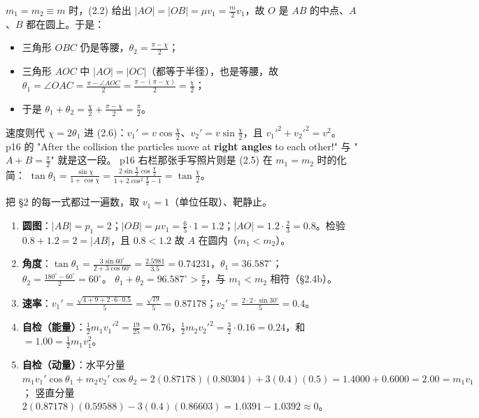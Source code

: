 \documentclass[11pt]{ctexart}
\providecommand{\th}{}\renewcommand{\th}{\theta}
\begin{document}


$m_1=m_2\equiv m$ 时，(2.2) 给出 $|AO|=|OB|=\mu v_1=\frac{m}{2}v_1$，故 $O$ 是 $AB$ 的中点、$A$、$B$ 都在圆上。于是：

\begin{itemize}
\item 三角形 $OBC$ 仍是等腰，$\th_2=\frac{\pi-\chi}{2}$；
\item 三角形 $AOC$ 中 $|AO|=|OC|$（都等于半径），也是等腰，故 $\th_1=\angle OAC=\frac{\pi-\angle AOC}{2}=\frac{\pi-(\pi-\chi)}{2}=\frac\chi2$；
\item 于是 $\th_1+\th_2=\frac\chi2+\frac{\pi-\chi}{2}=\frac\pi2$。
\end{itemize}
速度则代 $\chi=2\th_1$ 进 (2.6)：$v_1'=v\cos\frac\chi2$、$v_2'=v\sin\frac\chi2$，且 $v_1'^2+v_2'^2=v^2$。
p16 的 "After the collision the particles move at \textbf{right angles} to each other!" 与 "$A+B=\frac\pi2$" 就是这一段。
p16 右栏那张手写照片则是 (2.5) 在 $m_1=m_2$ 时的化简：
$\tan\th_1=\frac{\sin\chi}{1+\cos\chi}=\frac{2\sin\frac\chi2\cos\frac\chi2}{1+2\cos^2\frac\chi2-1}=\tan\frac\chi2$。


把 §2 的每一式都过一遍数，取 $v_1=1$（单位任取）、靶静止。

\begin{enumerate}[label=(\arabic*)]
\item \textbf{圆图}：$|AB|=p_1=2$；$|OB|=\mu v_1=\frac{6}{5}\cdot1=1.2$；$|AO|=1.2\cdot\frac23=0.8$。检验 $0.8+1.2=2=|AB|$，且 $0.8<1.2$ 故 $A$ 在圆内（$m_1<m_2$）。
\item \textbf{角度}：$\tan\th_1=\frac{3\sin60^\circ}{2+3\cos60^\circ}=\frac{2.5981}{3.5}=0.74231$，$\th_1=36.587^\circ$；$\th_2=\frac{180^\circ-60^\circ}{2}=60^\circ$。
$\th_1+\th_2=96.587^\circ>\frac\pi2$，与 $m_1<m_2$ 相符（§2.4b）。
\item \textbf{速率}：$v_1'=\frac{\sqrt{4+9+2\cdot6\cdot0.5}}{5}=\frac{\sqrt{19}}{5}=0.87178$；$v_2'=\frac{2\cdot2\cdot\sin30^\circ}{5}=0.4$。
\item \textbf{自检（能量）}：$\frac12 m_1v_1'^2=\frac{19}{25}=0.76$，$\frac12m_2v_2'^2=\frac{3}{2}\cdot0.16=0.24$，和 $=1.00=\frac12m_1v_1^2$。
\item \textbf{自检（动量）}：水平分量 $m_1v_1'\cos\th_1+m_2v_2'\cos\th_2=2(0.87178)(0.80304)+3(0.4)(0.5)=1.4000+0.6000=2.00=m_1v_1$；
竖直分量 $2(0.87178)(0.59588)-3(0.4)(0.86603)=1.0391-1.0392\approx0$。
\end{enumerate}
\end{document}
